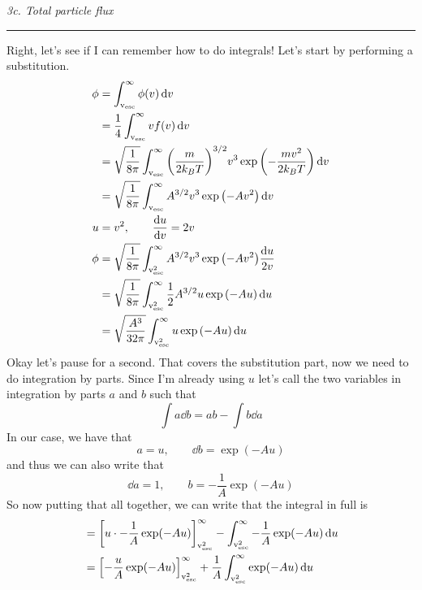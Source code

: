 \documentclass[12pt, letterpaper, twoside]{article}
\newcommand{\question}[1]{{\noindent \it #1}}
\newcommand{\answer}[1]{
    \par\noindent\rule{\textwidth}{0.4pt}#1\vspace{0.5cm}
}
\begin{document}
\question{3c. Total particle flux}
\answer{
    Right, let's see if I can remember how to do integrals! Let's start by performing a substitution.
    \begin{align}
        \phi &= \int_{\rm v_{\rm esc}}^{\infty} \phi(v) \dd{v} \\
             &= \frac{1}{4} \int_{\rm v_{\rm esc}}^{\infty} v f(v) \dd{v} \\
             &= \sqrt{\frac{1}{8 \pi}} \int_{\rm v_{\rm esc}}^{\infty} \qty( \frac{m}{2 k_B T} )^{3/2} v^3 \exp \qty(- \frac{m v^2}{2 k_B T}) \dd{v} \\
             &= \sqrt{\frac{1}{8 \pi}} \int_{\rm v_{\rm esc}}^{\infty} A^{3/2} v^3 \exp \qty(- A v^2) \dd{v} \\
           u &= v^2, \qquad \dv{u}{v} = 2 v \\
        \phi &= \sqrt{\frac{1}{8 \pi}} \int_{\rm v_{\rm esc}^2}^{\infty} A^{3/2} v^3 \exp \qty(- A v^2) \frac{\dd{u}}{2 v} \\
             &= \sqrt{\frac{1}{8 \pi}} \int_{\rm v_{\rm esc}^2}^{\infty} \frac{1}{2} A^{3/2} u \exp \qty(- A u) \dd{u} \\
             &= \sqrt{\frac{A^3}{32 \pi}} \int_{\rm v_{\rm esc}^2}^{\infty} u \exp \qty(- A u) \dd{u}
    \end{align}
    Okay let's pause for a second. That covers the substitution part, now we need to do integration by parts. Since I'm already using $u$ let's call the two variables in integration by parts $a$ and $b$ such that
    \begin{equation}
        \int a \dd{b} = a b - \int b \dd{a}
    \end{equation}
    In our case, we have that
    \begin{equation}
        a = u,\qquad \dd{b} = \exp(- A u)
    \end{equation}
    and thus we can also write that
    \begin{equation}
        \dd{a} = 1,\qquad b = - \frac{1}{A} \exp(- A u)
    \end{equation}
    So now putting that all together, we can write that the integral in full is
    \begin{align}
        &= \qty[ u \cdot - \frac{1}{A} \exp(- A u)]_{\rm v_{\rm esc}^2}^{\infty} - \int_{\rm v_{\rm esc}^2}^{\infty} - \frac{1}{A} \exp(- A u) \dd{u} \\
        &= \qty[ - \frac{u}{A} \exp(- A u)]_{\rm v_{\rm esc}^2}^{\infty} + \frac{1}{A} \int_{\rm v_{\rm esc}^2}^{\infty} \exp(- A u) \dd{u} \\

\end{align}}
\end{document}
